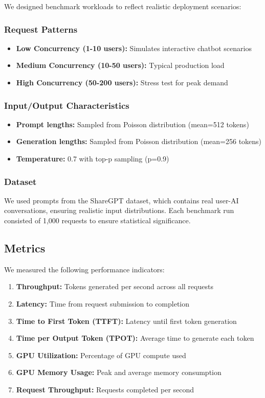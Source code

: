 \documentclass{article}
\begin{document}
We designed benchmark workloads to reflect realistic deployment scenarios:

\subsubsection{Request Patterns}

\begin{itemize}
    \item \textbf{Low Concurrency (1-10 users):} Simulates interactive chatbot scenarios
    \item \textbf{Medium Concurrency (10-50 users):} Typical production load
    \item \textbf{High Concurrency (50-200 users):} Stress test for peak demand
\end{itemize}

\subsubsection{Input/Output Characteristics}

\begin{itemize}
    \item \textbf{Prompt lengths:} Sampled from Poisson distribution (mean=512 tokens)
    \item \textbf{Generation lengths:} Sampled from Poisson distribution (mean=256 tokens)
    \item \textbf{Temperature:} 0.7 with top-p sampling (p=0.9)
\end{itemize}

\subsubsection{Dataset}

We used prompts from the ShareGPT dataset, which contains real user-AI conversations, ensuring realistic input distributions. Each benchmark run consisted of 1,000 requests to ensure statistical significance.

\subsection{Metrics}

We measured the following performance indicators:

\begin{enumerate}
    \item \textbf{Throughput:} Tokens generated per second across all requests
    \item \textbf{Latency:} Time from request submission to completion
    \item \textbf{Time to First Token (TTFT):} Latency until first token generation
    \item \textbf{Time per Output Token (TPOT):} Average time to generate each token
    \item \textbf{GPU Utilization:} Percentage of GPU compute used
    \item \textbf{GPU Memory Usage:} Peak and average memory consumption
    \item \textbf{Request Throughput:} Requests completed per second
\end{enumerate}
\end{document}
